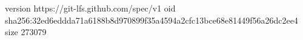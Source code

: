 version https://git-lfs.github.com/spec/v1
oid sha256:32ed6eddda71a6188b8d970899f35a4594a2cfc13bce68e81449f56a26dc2ee4
size 273079
